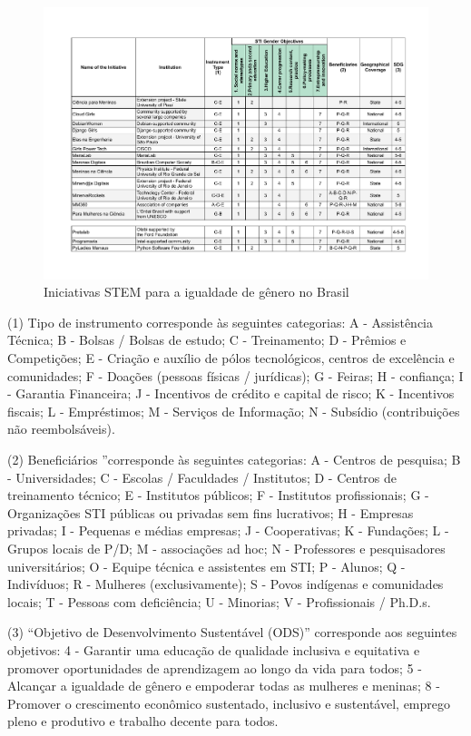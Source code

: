 \begin{figure}
    \centering
    \includegraphics[width=.9\textwidth]{chaps/Images/SAGAMatrixV2.pdf}
    \caption{Iniciativas STEM para a igualdade de gênero no Brasil}
    \label{fig:sagamatriz}
\end{figure}

(1) Tipo de instrumento corresponde às seguintes categorias: A - Assistência Técnica; B - Bolsas / Bolsas de estudo; C - Treinamento; D - Prêmios e Competições; E - Criação e auxílio de pólos tecnológicos, centros de excelência e comunidades; F - Doações (pessoas físicas / jurídicas); G - Feiras; H - confiança; I - Garantia Financeira; J - Incentivos de crédito e capital de risco; K - Incentivos fiscais; L - Empréstimos; M - Serviços de Informação; N - Subsídio (contribuições não reembolsáveis).

(2) Beneficiários ”corresponde às seguintes categorias: A - Centros de pesquisa; B - Universidades; C - Escolas / Faculdades / Institutos; D - Centros de treinamento técnico; E - Institutos públicos; F - Institutos profissionais; G - Organizações STI públicas ou privadas sem fins lucrativos; H - Empresas privadas; I - Pequenas e médias empresas; J - Cooperativas; K - Fundações; L - Grupos locais de P/D; M - associações ad hoc; N - Professores e pesquisadores universitários; O - Equipe técnica e assistentes em STI; P - Alunos; Q - Indivíduos; R - Mulheres (exclusivamente); S - Povos indígenas e comunidades locais; T - Pessoas com deficiência; U - Minorias; V - Profissionais / Ph.D.s.

(3) “Objetivo de Desenvolvimento Sustentável (ODS)” corresponde aos seguintes objetivos: 4 - Garantir uma educação de qualidade inclusiva e equitativa e promover oportunidades de aprendizagem ao longo da vida para todos; 5 - Alcançar a igualdade de gênero e empoderar todas as mulheres e meninas; 8 - Promover o crescimento econômico sustentado, inclusivo e sustentável, emprego pleno e produtivo e trabalho decente para todos.

